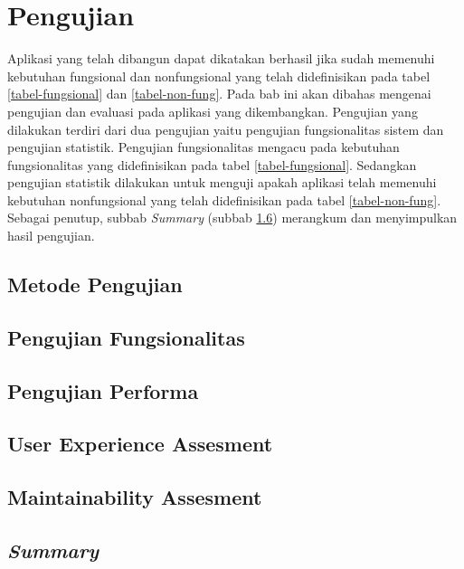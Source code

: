 \section{Pengujian}
	Aplikasi yang telah dibangun dapat dikatakan berhasil jika sudah memenuhi kebutuhan fungsional dan nonfungsional yang telah didefinisikan pada tabel \ref{tabel-fungsional} dan \ref{tabel-non-fung}. Pada bab ini akan dibahas mengenai pengujian dan evaluasi pada aplikasi yang dikembangkan. Pengujian yang dilakukan terdiri dari dua pengujian yaitu pengujian fungsionalitas sistem dan pengujian statistik. Pengujian fungsionalitas mengacu pada kebutuhan fungsionalitas yang didefinisikan pada tabel \ref{tabel-fungsional}. Sedangkan pengujian statistik dilakukan untuk menguji apakah aplikasi telah memenuhi kebutuhan nonfungsional yang telah didefinisikan pada tabel \ref{tabel-non-fung}. Sebagai penutup, subbab \textit{Summary} (subbab \ref{summary-pengujian}) merangkum dan menyimpulkan hasil pengujian.

	
	\subsection{Metode Pengujian}
	
		
	\subsection{Pengujian Fungsionalitas}
	\label{uji-fungsional}
	
	
	\subsection{Pengujian Performa}
	\label{uji-performa}
	
	
	\subsection{User Experience Assesment}
	\label{[uji-ux}
	
	
	\subsection{Maintainability Assesment}
	\label{uji-maintainability}
	
	
	\subsection{\textit{Summary}}
	\label{summary-pengujian}
	
	
		
		
